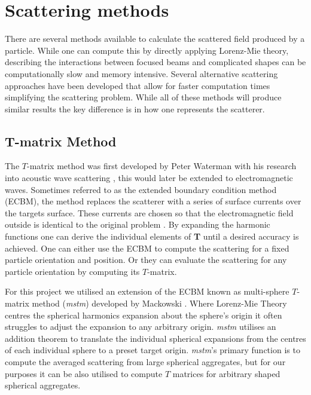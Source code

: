 \section{Scattering methods}
\label{sec:scattering}
There are several methods available to calculate the scattered 
field produced by a particle. While one can compute this by 
directly applying Lorenz-Mie theory, describing the interactions 
between focused beams and complicated shapes can be computationally 
slow and memory intensive. Several alternative scattering approaches 
have been developed that allow for faster computation times 
simplifying the scattering problem. While all of these methods will
produce similar results the key difference is in how one represents
the scatterer.
\subsection{T-matrix Method}
The $T$-matrix method was first developed by Peter Waterman with 
his research into acoustic wave scattering \cite{Waterman1969}, 
this would later be extended to electromagnetic waves. Sometimes 
referred to as the extended boundary condition method (ECBM), the 
method replaces the scatterer with a series of surface currents 
over the targets surface. These currents are chosen so that the 
electromagnetic field outside is identical to the original problem 
\cite{Wriedt1998}. By expanding the harmonic functions one can 
derive the individual elements of \textbf{T} until a desired 
accuracy is achieved. One can either use the ECBM to compute the 
scattering for a fixed particle orientation and position. Or they
can evaluate the scattering for any particle orientation by 
computing its $T$-matrix.

For this project we utilised an extension of the ECBM known as 
multi-sphere $T$-matrix method (\textit{mstm}) developed by 
Mackowski \cite{Mackowski2011}. Where Lorenz-Mie Theory centres
the spherical harmonics expansion about the sphere's origin it
often struggles to adjust the expansion to any arbitrary origin.
\textit{mstm} utilises an addition theorem to translate the 
individual spherical expansions from the centres of each 
individual sphere to a preset target origin. \textit{mstm}'s 
primary function is to compute the averaged scattering from 
large spherical aggregates, but for our purposes it can be
also utilised to compute $T$ matrices for arbitrary shaped
spherical aggregates.


